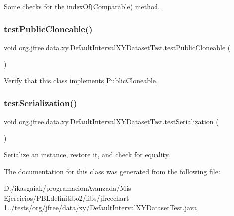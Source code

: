 Some checks for the index\+Of(\+Comparable) method. \mbox{\label{classorg_1_1jfree_1_1data_1_1xy_1_1_default_interval_x_y_dataset_test_ac87ef0b4f192141b5ee7e655d6fd579b}} 
\subsubsection{\texorpdfstring{test\+Public\+Cloneable()}{testPublicCloneable()}}
{\footnotesize\ttfamily void org.\+jfree.\+data.\+xy.\+Default\+Interval\+X\+Y\+Dataset\+Test.\+test\+Public\+Cloneable (\begin{DoxyParamCaption}{ }\end{DoxyParamCaption})}

Verify that this class implements \mbox{\hyperlink{}{Public\+Cloneable}}. \mbox{\label{classorg_1_1jfree_1_1data_1_1xy_1_1_default_interval_x_y_dataset_test_a3c418890b3f461309d5133f1067e8407}} 
\subsubsection{\texorpdfstring{test\+Serialization()}{testSerialization()}}
{\footnotesize\ttfamily void org.\+jfree.\+data.\+xy.\+Default\+Interval\+X\+Y\+Dataset\+Test.\+test\+Serialization (\begin{DoxyParamCaption}{ }\end{DoxyParamCaption})}

Serialize an instance, restore it, and check for equality. 

The documentation for this class was generated from the following file\+:\begin{DoxyCompactItemize}
\item 
D\+:/ikasgaiak/programacion\+Avanzada/\+Mis Ejercicios/\+P\+B\+Ldefinitibo2/libs/jfreechart-\/1../tests/org/jfree/data/xy/\mbox{\hyperlink{_default_interval_x_y_dataset_test_8java}{Default\+Interval\+X\+Y\+Dataset\+Test.\+java}}\end{DoxyCompactItemize}
